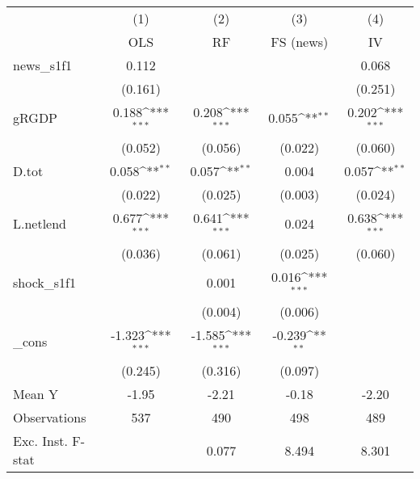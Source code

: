 {
\def\sym#1{\ifmmode^{#1}\else\(^{#1}\)\fi}
\begin{tabular}{l*{4}{c}}
\toprule
            &\multicolumn{1}{c}{(1)}&\multicolumn{1}{c}{(2)}&\multicolumn{1}{c}{(3)}&\multicolumn{1}{c}{(4)}\\
            &\multicolumn{1}{c}{OLS}&\multicolumn{1}{c}{RF}&\multicolumn{1}{c}{FS (news)}&\multicolumn{1}{c}{IV}\\
\midrule
news\_s1f1   &       0.112         &                     &                     &       0.068         \\
            &     (0.161)         &                     &                     &     (0.251)         \\
\addlinespace
gRGDP       &       0.188\sym{***}&       0.208\sym{***}&       0.055\sym{**} &       0.202\sym{***}\\
            &     (0.052)         &     (0.056)         &     (0.022)         &     (0.060)         \\
\addlinespace
D.tot       &       0.058\sym{**} &       0.057\sym{**} &       0.004         &       0.057\sym{**} \\
            &     (0.022)         &     (0.025)         &     (0.003)         &     (0.024)         \\
\addlinespace
L.netlend   &       0.677\sym{***}&       0.641\sym{***}&       0.024         &       0.638\sym{***}\\
            &     (0.036)         &     (0.061)         &     (0.025)         &     (0.060)         \\
\addlinespace
shock\_s1f1  &                     &       0.001         &       0.016\sym{***}&                     \\
            &                     &     (0.004)         &     (0.006)         &                     \\
\addlinespace
\_cons      &      -1.323\sym{***}&      -1.585\sym{***}&      -0.239\sym{**} &                     \\
            &     (0.245)         &     (0.316)         &     (0.097)         &                     \\
\midrule
Mean Y      &       -1.95         &       -2.21         &       -0.18         &       -2.20         \\
Observations&         537         &         490         &         498         &         489         \\
Exc. Inst. F-stat&                     &       0.077         &       8.494         &       8.301         \\
\bottomrule
\end{tabular}
}
